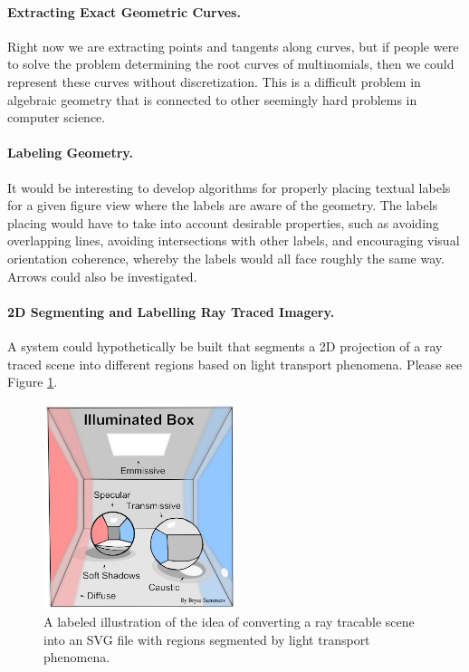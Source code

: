 \documentclass[12pt, letterpaper]{article}
\begin{document}
		\paragraph{Extracting Exact Geometric Curves.}
		Right now we are extracting points and tangents along curves, but if people were to solve the problem determining the root curves of multinomials, then we could represent these curves without discretization.
		This is a difficult problem in algebraic geometry that is connected to other seemingly hard problems in computer science.

		\paragraph{Labeling Geometry.}

		It would be interesting to develop algorithms for properly placing textual labels for a given figure view where the labels are aware of the geometry.
		The labels placing would have to take into account desirable properties, such as avoiding overlapping lines, avoiding intersections with other labels, and encouraging visual orientation coherence, whereby the labels would all face roughly the same way.
		Arrows could also be investigated.

		\paragraph{2D Segmenting and Labelling Ray Traced Imagery.}

		A system could hypothetically be built that segments a 2D projection of a ray traced scene into different regions based on light transport phenomena.
		Please see Figure \ref{fig:cornell_box_illustration}.

		\begin{figure}[h]
		\centering
		\includegraphics[width=0.5\textwidth]{cornell_box_illustration}
		\caption{A labeled illustration of the idea of converting a ray tracable scene into an SVG file with regions segmented by light transport phenomena.}
		\label{fig:cornell_box_illustration}
		\end{figure}
\end{document}

